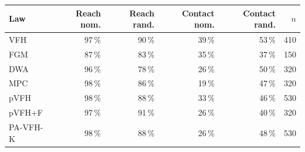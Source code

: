 \footnotesize
\setlength{\tabcolsep}{3pt}
\begin{tabular}{lrrrrr}
\toprule
Law & Reach nom. & Reach rand. & Contact nom. & Contact rand. & $n$ \\
\midrule
VFH & 97\,\% & 90\,\% & 39\,\% & 53\,\% & 410 \\
FGM & 87\,\% & 83\,\% & 35\,\% & 37\,\% & 150 \\
DWA & 96\,\% & 78\,\% & 26\,\% & 50\,\% & 320 \\
MPC & 98\,\% & 86\,\% & 19\,\% & 47\,\% & 320 \\
pVFH & 98\,\% & 88\,\% & 33\,\% & 46\,\% & 530 \\
pVFH+F & 97\,\% & 91\,\% & 26\,\% & 40\,\% & 320 \\
PA-VFH-K & 98\,\% & 88\,\% & 26\,\% & 48\,\% & 530 \\
\bottomrule
\end{tabular}

